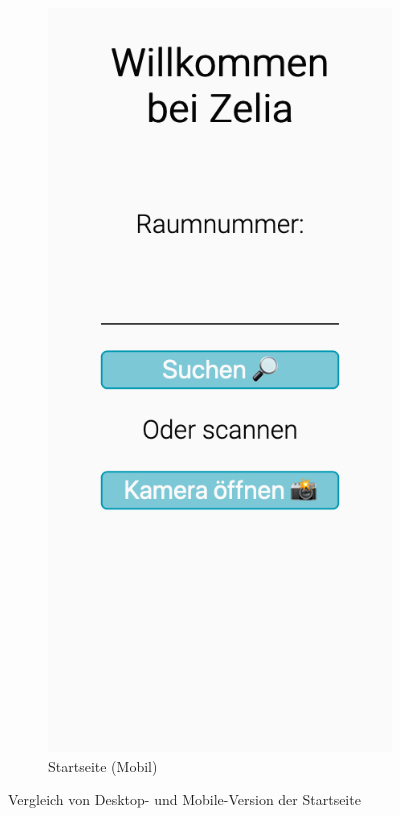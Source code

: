 \begin{figure}[H]
\begin{subfigure}[c]{0.34\textwidth}
        \includegraphics[width=\textwidth]{media/ResponsiveDesign/ZeliaHomeMobile.png}
        \caption{Startseite (Mobil)}
        \label{fig:homeMobile}
    \end{subfigure}
    \caption{Vergleich von Desktop- und Mobile-Version der Startseite}
    \label{fig:home}
\end{figure}